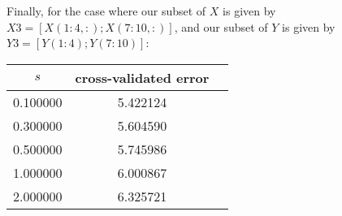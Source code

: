 \documentclass[11pt]{article}
\begin{document}
Finally, for the case where our subset of $X$ is given by $X3 = [X(1:4,:); X(7:10,:)]$, and our subset of $Y$ is given by $Y3 = [Y(1:4); Y(7:10)]$: \\

\begin{tabular}{ | c | c | c | }
  \hline
  $s$ & cross-validated error \\
  \hline
  \hline
  0.100000 & 5.422124 \\ 
  \hline
  0.300000 & 5.604590 \\ 
  \hline
  0.500000 & 5.745986 \\ 
  \hline
  1.000000 & 6.000867 \\ 
  \hline
  2.000000 & 6.325721 \\ 
  \hline
\end{tabular}
\end{document}
